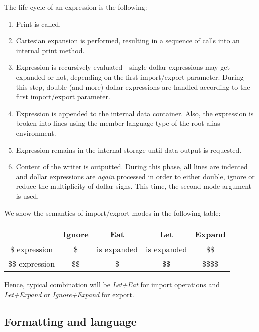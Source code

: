 The life-cycle of an expression is the following:
\begin{enumerate}
  \item Print is called.
  \item Cartesian expansion is performed, resulting in a sequence of calls into an internal print method.
  \item Expression is recursively evaluated - single dollar expressions may get expanded or not, depending on the first import/export parameter. During this step, double (and more) dollar expressions are handled according to the first import/export parameter. 
  \item Expression is appended to the internal data container. Also, the expression is broken into lines using the member language type of the root alias environment.
  \item Expression remains in the internal storage until data output is requested.
  \item Content of the writer is outputted. During this phase, all lines are indented and dollar expressions are \emph{again} processed in order to either double, ignore or reduce the multiplicity of dollar signs. This time, the second mode argument is used.
\end{enumerate}

We show the semantics of import/export modes in the following table:

\mybeginfig
\begin{center}
\begin{tabular}{c|c|c|c|c}
                  & Ignore & Eat          & Let          & Expand    \\
  \hline
  \$ expression   & \$     & is expanded  & is expanded  & \$\$      \\
  \hline
  \$\$ expression & \$\$   & \$           & \$\$         & \$\$\$\$  \\
\end{tabular}
\end{center}

  Hence, typical combination will be \emph{Let+Eat} for import operations and \emph{Let+Expand} or \emph{Ignore+Expand} for export. 

\subsection*{Formatting and language}

